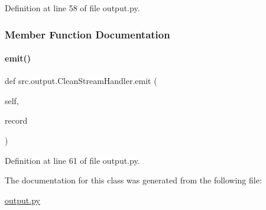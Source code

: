 Definition at line 58 of file output.\+py.



\subsubsection{Member Function Documentation}
\mbox{\label{classsrc_1_1output_1_1CleanStreamHandler_aa7b7a73874a639c340115dae4279bf5b}} 
\paragraph{\texorpdfstring{emit()}{emit()}}
{\footnotesize\ttfamily def src.\+output.\+Clean\+Stream\+Handler.\+emit (\begin{DoxyParamCaption}\item[{}]{self,  }\item[{}]{record }\end{DoxyParamCaption})}



Definition at line 61 of file output.\+py.



The documentation for this class was generated from the following file\+:\begin{DoxyCompactItemize}
\item 
\hyperlink{output_8py}{output.\+py}\end{DoxyCompactItemize}
